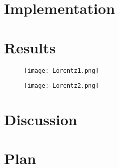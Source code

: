 \documentclass[]{article}
\begin{document}
\section{Implementation}

\section{Results}
\begin{figure}[H]
	\texttt{[image: Lorentz1.png]}
\end{figure}

\begin{figure}[H]
	\texttt{[image: Lorentz2.png]}
\end{figure}
\section{Discussion}

\section{Plan}
\end{document}
